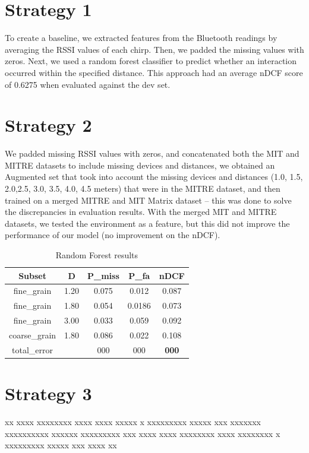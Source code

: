 \documentclass[conference]{IEEEtran}
\begin{document}
\section{Strategy 1}
To create a baseline, we extracted features from the Bluetooth readings by averaging the RSSI values of each chirp. Then, we padded the missing values with zeros. Next, we used a random forest classifier to predict whether an interaction occurred within the specified distance. This approach had an average nDCF score of 0.6275 when evaluated against the dev set.\\


\section{Strategy 2}
We padded missing RSSI values with zeros, and concatenated both the MIT and MITRE datasets \cite{b6} \cite{b7} to include missing devices and distances, we obtained an Augmented set that took into account the missing devices and distances (1.0, 1.5, 2.0,2.5, 3.0, 3.5, 4.0, 4.5 meters) that were in the MITRE dataset, and then trained on a merged MITRE and MIT Matrix dataset – this was done to solve the discrepancies in evaluation results. With the merged MIT and MITRE datasets, we tested the environment as a feature, but this did not improve the performance of our model (no improvement on the nDCF).\\

\begin{table}[h!]
\begin{center}
\begin{tabular}{ c c c c c }
 Subset & D & P\_miss & P\_fa & nDCF  \\ \hline
 fine\_grain & 1.20 & 0.075 & 0.012 & 0.087 \\ 
 fine\_grain & 1.80 & 0.054 & 0.0186 & 0.073 \\  
 fine\_grain & 3.00 & 0.033 & 0.059 & 0.092 \\
 coarse\_grain & 1.80 & 0.086 & 0.022 & 0.108 \\ \hline
 total\_error & & 000 & 000 & \textbf{000}
\end{tabular}
\caption{Random Forest results}
\label{table:c_m3}
\end{center}
\end{table}

\section{Strategy 3}
xx xxxx xxxxxxxx xxxx xxxx xxxxx x xxxxxxxxx xxxxx xxx xxxxxxx xxxxxxxxxx xxxxxx xxxxxxxxx xxx xxxx xxxx xxxxxxxx xxxx xxxxxxxx x xxxxxxxxx xxxxx xxx xxxx xx\\
\end{document}
